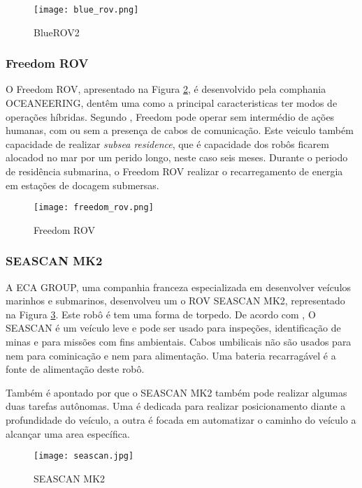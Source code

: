 \begin{figure}
  \centering 
  \texttt{[image: blue\_rov.png]}
  \caption{BlueROV2}
  \label{fig:blue}
\end{figure}

\subsubsection{Freedom ROV}


O Freedom ROV, apresentado na Figura \ref{fig:freedom_rov}, é desenvolvido pela comphania OCEANEERING, dentêm uma como a principal caracteristicas ter modos de operações híbridas. Segundo \cite{Bogue1}, Freedom pode operar sem intermédio de ações humanas, com ou sem a presença de cabos de comunicação. Este veiculo também capacidade de realizar \textit{subsea residence}, que é capacidade dos robôs ficarem alocadod no mar por um perido longo, neste caso seis meses. Durante o periodo de residência submarina, o Freedom ROV realizar o recarregamento de energia em estações de docagem submersas.


\begin{figure}
  \centering 
  \texttt{[image: freedom\_rov.png]}
  \caption{Freedom ROV}
  \label{fig:freedom_rov}
\end{figure}

\subsubsection{SEASCAN MK2}


A ECA GROUP, uma companhia franceza especializada em desenvolver veículos marinhos e submarinos, desenvolveu um o ROV SEASCAN MK2, representado na Figura \ref{fig:seascan}. Este robô é tem uma forma de torpedo. De acordo com \cite{ECA_GROUP}, O SEASCAN é um veículo leve e pode ser usado para inspeções, identificação de minas e para missões com fins ambientais. Cabos umbilicais não são usados para nem para cominicação e nem para alimentação.  Uma bateria recarragável é a fonte de alimentação deste robô.

Também é apontado por \cite{ECA_GROUP} que o SEASCAN MK2 também pode realizar algumas duas tarefas autônomas. Uma é dedicada para realizar posicionamento diante a profundidade do veículo, a outra é focada em automatizar o caminho do veículo a alcançar uma area específica.



\begin{figure}
  \centering 
  \texttt{[image: seascan.jpg]}
  \caption{SEASCAN MK2}
  \label{fig:seascan}
\end{figure}


